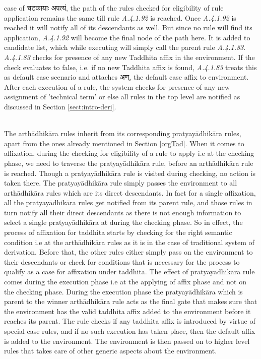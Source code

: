 \documentclass[a4paper,11pt,twoside,openright]{report}
\begin{document}
case of {\skt चटकायाः अपत्यं}, the path of the rules checked for eligibility of rule application remains the same till rule \textsl{ A.4.1.92} is reached. Once \textsl{ A.4.1.92} is reached it will notify all of its descendants as well. But since no rule will find its application, \textsl{ A.4.1.92} will become the final node of the path here. It is added to candidate list, which while executing will simply call the parent rule \textsl{ A.4.1.83}. \textsl{ A.4.1.83} checks for presence of any new Taddhita affix in the environment. If the check evaluates to false, i.e. if no new Taddhita affix is found, \textsl{ A.4.1.83} treats this as default case scenario and attaches {\skt अण्}, the default case affix to environment. After each execution of a rule, the system checks for presence of any new assignment of 'technical term' or else all rules in the top level are notified as discussed in Section \ref{sect:intro-deri}.


\\
The arthādhikāra rules inherit from its corresponding pratyayādhikāra rules, apart from the ones already mentioned in Section \ref{orgTad}. When it comes to affixation, during the checking for eligibility of a rule to apply i.e at the checking phase, we need to traverse the  pratyayādhikāra rule, before an arthādhikāra rule is reached. Though a pratyayādhikāra rule is visited during checking, no action is taken there. The pratyayādhikāra rule simply passes the environment to all arthādhikāra rules which are its direct descendants. In fact for a single affixation, all the pratyayādhikāra rules get notified from its parent rule, and those rules in turn notify all their direct descendants as there is not enough information to select a single pratyayādhikāra at during the checking phase. So in effect, the process of affixation for taddhita starts by checking for the right semantic condition i.e at the arthādhikāra rules as it is in the case of traditional system of derivation. Before that, the other rules either simply pass on the environment to their descendants or check for conditions that is necessary for the process to qualify as a case for affixation under taddhita. The effect of pratyayādhikāra rule comes during the execution phase i.e at the applying of affix phase and not on the checking phase. During the execution phase the pratyayādhikāra which is parent to the winner arthādhikāra rule acts as the final gate that makes sure that the environment has the valid taddhita affix added to the environment before it reaches its parent. The rule checks if any taddhita affix is introduced by virtue of special case rules, and if no such execution has taken place, then the default affix is added to the environment. The environment is then passed on to higher level rules that takes care of other generic aspects about the environment.
\end{document}
